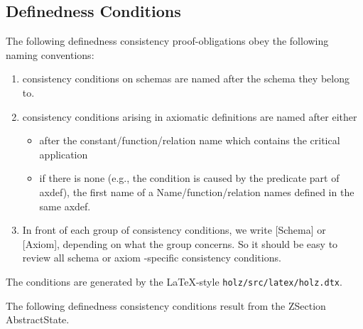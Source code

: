 \subsection{Definedness Conditions}

The following definedness consistency proof-obligations 
obey the following naming conventions:

\begin{enumerate}
\item consistency conditions on schemas are named after
      the schema they belong to.
 
\item consistency conditions arising in axiomatic definitions are named
      after either 
      \begin{itemize}
      \item after the constant/function/relation name which contains the
        critical application 
      \item if there is none (e.g., the condition is caused by the predicate
        part of axdef), the first name of a Name/function/relation names defined
        in the same axdef.
      \end{itemize}
\item In front of each group of consistency conditions, we write [Schema] or
      [Axiom], depending on what the group concerns.  So it should be easy to
      review all schema or axiom -specific consistency conditions.

\end{enumerate}

The conditions are generated by the \LaTeX-style \verb|holz/src/latex/holz.dtx|.



\vspace{1ex}\noindent

%
%

%
%

The following definedness consistency conditions result from the ZSection AbstractState. 

%
%

%
%

